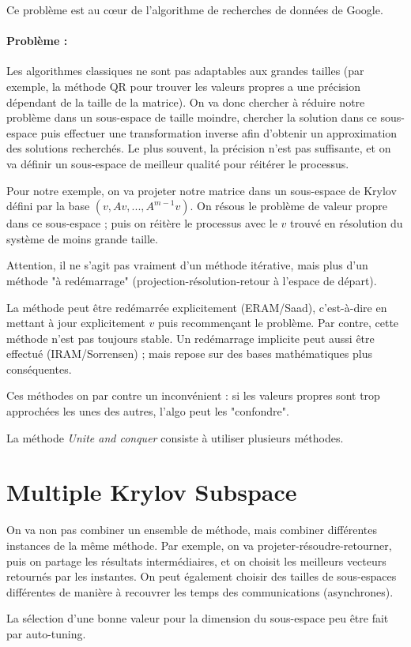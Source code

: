 \documentclass{article}
\begin{document}
Ce problème est au cœur de l'algorithme de recherches de données de Google.
\bigskip

\paragraph{Problème :}
Les algorithmes classiques ne sont pas adaptables aux grandes tailles (par exemple, la méthode QR pour trouver les valeurs propres a une précision dépendant de la taille de la matrice). On va donc chercher à réduire notre problème dans un sous-espace de taille moindre, chercher la solution dans ce sous-espace puis effectuer une transformation inverse afin d'obtenir un approximation des solutions recherchés. Le plus souvent, la précision n'est pas suffisante, et on va définir un sous-espace de meilleur qualité pour réitérer le processus.

Pour notre exemple, on va projeter notre matrice dans un sous-espace de Krylov défini par la base $(v, Av, ..., A^{m-1}v)$. On résous le problème de valeur propre dans ce sous-espace ; puis on réitère le processus avec le $v$ trouvé en résolution du système de moins grande taille.

Attention, il ne s'agit pas vraiment d'un méthode itérative, mais plus d'un méthode "à redémarrage" (projection-résolution-retour à l'espace de départ).
\bigskip

La méthode peut être redémarrée explicitement (ERAM/Saad), c'est-à-dire en mettant à jour explicitement $v$ puis recommençant le problème. Par contre, cette méthode n'est pas toujours stable.
Un redémarrage implicite peut aussi être effectué (IRAM/Sorrensen) ; mais repose sur des bases mathématiques plus conséquentes.

Ces méthodes on par contre un inconvénient : si les valeurs propres sont trop approchées les unes des autres, l'algo peut les "confondre".
\bigskip


La méthode \emph{Unite and conquer} consiste à utiliser plusieurs méthodes.


\section{Multiple Krylov Subspace}
On va non pas combiner un ensemble de méthode, mais combiner différentes instances de la même méthode. Par exemple, on va projeter-résoudre-retourner, puis on partage les résultats intermédiaires, et on choisit les meilleurs vecteurs retournés par les instantes. On peut également choisir des tailles de sous-espaces différentes de manière à recouvrer les temps des communications (asynchrones).

La sélection d'une bonne valeur pour la dimension du sous-espace peu être fait par auto-tuning.


  
\end{document}
